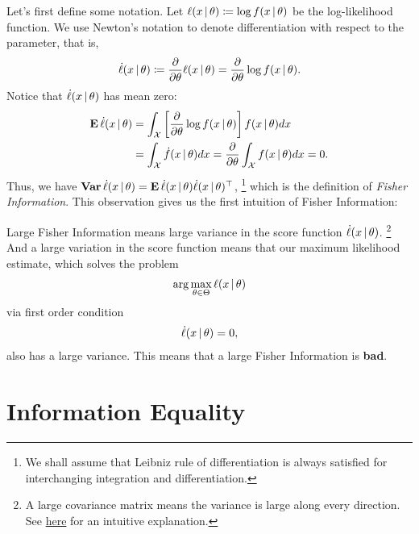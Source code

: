 \documentclass[a4paper]{article}
\begin{document}
Let's first define some notation.
Let $\ell(x\,|\,\theta)\coloneqq\log f(x\,|\,\theta)$ be the log-likelihood function.
We use Newton's notation to denote differentiation with respect to the parameter,
that is,
\begin{align*}
	\dot\ell(x\,|\,\theta)
	\coloneqq \frac{\partial}{\partial\theta} \ell(x\,|\,\theta)
	= \frac{\partial}{\partial\theta} \log f(x\,|\,\theta).
\end{align*}
Notice that $\dot\ell(x\,|\,\theta)$ has mean zero:
\begin{align*}
	\operatorname{\text{\textrm{\upshape\textbf{E}}}}\dot\ell(x\,|\,\theta)
	&= \int_{\mathcal{X}} \left[ \frac{\partial}{\partial\theta} \log f(x\,|\,\theta) \right] f(x\,|\,\theta) dx \\
	&= \int_{\mathcal{X}} \dot f(x\,|\,\theta) dx 
	= \frac{\partial}{\partial\theta} \int_{\mathcal{X}} f(x\,|\,\theta) dx = 0.
\end{align*}
Thus, we have $\operatorname{\text{\textrm{\upshape\textbf{Var}}}}\dot\ell(x\,|\,\theta) = \operatorname{\text{\textrm{\upshape\textbf{E}}}}\dot\ell(x\,|\,\theta)\dot\ell(x\,|\,\theta)^{\top}$,
\footnote{
	We shall assume that Leibniz rule of differentiation is always satisfied for interchanging integration and differentiation.
}
which is the definition of \emph{Fisher Information}.
This observation gives us the first intuition of Fisher Information:

\begin{intuition}\label{intuition-1}
	Large Fisher Information means large variance in the score function $\dot\ell(x\,|\,\theta)$.
	\footnote{
		A large covariance matrix means the variance is large along every direction.
		See \href{https://jessekelighine.com/\#statistics}{here} for an intuitive explanation.
	}
	And a large variation in the score function means that our maximum likelihood estimate,
	which solves the problem
	\begin{align*}
		\arg\max_{\theta\in\Theta}\ell(x\,|\,\theta)
	\end{align*}
	via first order condition
	\begin{align*} 
		\dot\ell(x\,|\,\theta)=0,
	\end{align*}
	also has a large variance.
	This means that a large Fisher Information is \textbf{bad}.
\end{intuition}

\section{Information Equality}
\end{document}
